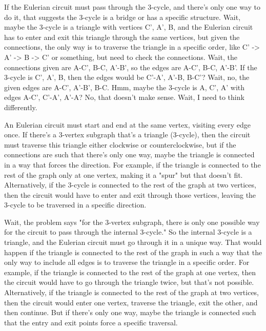 If the Eulerian circuit must pass through the 3-cycle, and there's only one way to do it, that suggests the 3-cycle is a bridge or has a specific structure. Wait, maybe the 3-cycle is a triangle with vertices C', A', B, and the Eulerian circuit has to enter and exit this triangle through the same vertices, but given the connections, the only way is to traverse the triangle in a specific order, like C' -> A' -> B -> C' or something, but need to check the connections. Wait, the connections given are A-C', B-C, A'-B', so the edges are A-C', B-C, A'-B'. If the 3-cycle is C', A', B, then the edges would be C'-A', A'-B, B-C'? Wait, no, the given edges are A-C', A'-B', B-C. Hmm, maybe the 3-cycle is A, C', A' with edges A-C', C'-A', A'-A? No, that doesn't make sense. Wait, I need to think differently. 

An Eulerian circuit must start and end at the same vertex, visiting every edge once. If there's a 3-vertex subgraph that's a triangle (3-cycle), then the circuit must traverse this triangle either clockwise or counterclockwise, but if the connections are such that there's only one way, maybe the triangle is connected in a way that forces the direction. For example, if the triangle is connected to the rest of the graph only at one vertex, making it a "spur" but that doesn't fit. Alternatively, if the 3-cycle is connected to the rest of the graph at two vertices, then the circuit would have to enter and exit through those vertices, leaving the 3-cycle to be traversed in a specific direction. 

Wait, the problem says "for the 3-vertex subgraph, there is only one possible way for the circuit to pass through the internal 3-cycle." So the internal 3-cycle is a triangle, and the Eulerian circuit must go through it in a unique way. That would happen if the triangle is connected to the rest of the graph in such a way that the only way to include all edges is to traverse the triangle in a specific order. For example, if the triangle is connected to the rest of the graph at one vertex, then the circuit would have to go through the triangle twice, but that's not possible. Alternatively, if the triangle is connected to the rest of the graph at two vertices, then the circuit would enter one vertex, traverse the triangle, exit the other, and then continue. But if there's only one way, maybe the triangle is connected such that the entry and exit points force a specific traversal. 

